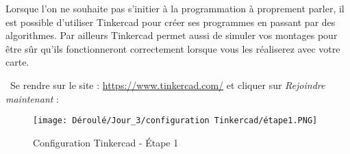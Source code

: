 \begin{flushleft}
Lorsque l'on ne souhaite pas s'initier à la programmation à proprement parler, il est possible d'utiliser Tinkercad pour créer ses programmes en passant par des algorithmes. Par ailleurs Tinkercad permet aussi de simuler vos montages pour être sûr qu'ils fonctionneront correctement lorsque vous les réaliserez avec votre carte.\vspace{0.2cm}
\end{flushleft}

\begin{flushleft}
\textbullet \, Se rendre sur le site : \url{https://www.tinkercad.com/} et cliquer sur \textit{Rejoindre maintenant} :
\end{flushleft}

\begin{figure}[!h]
    \centering
    \texttt{[image: Déroulé/Jour\_3/configuration Tinkercad/étape1.PNG]}
    \caption{Configuration Tinkercad - \'Etape 1}
    \label{fig:my_label}
\end{figure}


